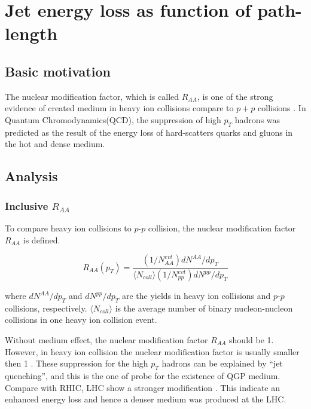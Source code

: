 
\newpage
\chapter{Jet energy loss as function of path-length}

\section{Basic motivation}

The nuclear modification factor, which is called $R_{AA}$, is one of the strong evidence of created medium in heavy ion collisions compare to $p+p$ collisions \cite{Adcox:2001jp}. In Quantum Chromodynamics(QCD), the suppression of high $p_T$ hadrons was predicted as the result of the energy loss of hard-scatters quarks and gluons in the hot and dense medium. 


\section{Analysis}
	\subsection{Inclusive $R_{AA}$}
	To compare heavy ion collisions to $p$-$p$ collision, the nuclear modification factor $R_{AA}$ is defined. 
	
  \begin{equation}
  R_{AA}(p_{T}) = \frac{(1/N^{evt}_{AA})dN^{AA}/dp_{T}}{ \langle N_{coll}\rangle(1/N^{evt}_{pp})dN^{pp}/dp_{T}}
  \end {equation} 
  \smallskip
  
  where $dN^{AA}/dp_T$ and $dN^{pp}/dp_T$ are the yields in heavy ion collisions and $p$-$p$ collisions, respectively. $ \langle N_{coll}\rangle$ is the average number of binary nucleon-nucleon collisions in one heavy ion collision event. 

 Without medium effect, the nuclear modification factor $R_{AA}$ should be 1. However, in heavy ion collision the nuclear modification factor is usually smaller then 1 \cite{Roland201470, PhysRevLett.101.232301, PhysRevLett.91.172302}. These suppression for the high $p_T$ hadrons can be explained by ``jet quenching'', and this is the one of probe for the existence of QGP medium. Compare with RHIC, LHC show a stronger modification  \cite{Roland201470}. This indicate an enhanced energy loss and hence a denser medium was produced at the LHC. 



